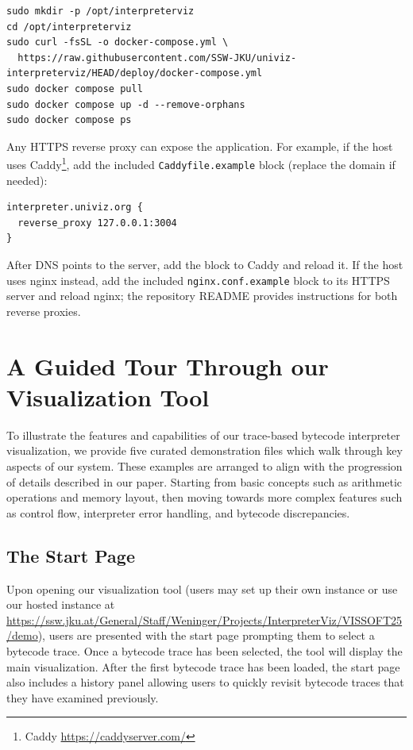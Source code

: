 \documentclass[conference]{IEEEtran}
\begin{document}
\begin{lstlisting}[language={},numbers=none,basicstyle=\ttfamily\scriptsize]
sudo mkdir -p /opt/interpreterviz
cd /opt/interpreterviz
sudo curl -fsSL -o docker-compose.yml \
  https://raw.githubusercontent.com/SSW-JKU/univiz-interpreterviz/HEAD/deploy/docker-compose.yml
sudo docker compose pull
sudo docker compose up -d --remove-orphans
sudo docker compose ps
\end{lstlisting}

Any HTTPS reverse proxy can expose the application. For example, if the host uses Caddy\footnote{Caddy \url{https://caddyserver.com/}}, add the included \texttt{Caddyfile.example} block (replace the domain if needed):

\begin{lstlisting}[language={},numbers=none,basicstyle=\ttfamily\scriptsize]
interpreter.univiz.org {
  reverse_proxy 127.0.0.1:3004
}
\end{lstlisting}

After DNS points to the server, add the block to Caddy and reload it. If the host uses nginx instead, add the included \texttt{nginx.conf.example} block to its HTTPS server and reload nginx; the repository README provides instructions for both reverse proxies.

\section{A Guided Tour Through our\\Visualization Tool}

To illustrate the features and capabilities of our trace-based bytecode interpreter visualization, we provide five curated demonstration files which walk through key aspects of our system. 
These examples are arranged to align with the progression of details described in our paper. Starting from basic concepts such as arithmetic operations and memory layout, then moving towards more complex features such as control flow, interpreter error handling, and bytecode discrepancies.

\subsection{The Start Page}

Upon opening our visualization tool (users may set up their own instance or use our hosted instance at \url{https://ssw.jku.at/General/Staff/Weninger/Projects/InterpreterViz/VISSOFT25/demo}), users are presented with the start page prompting them to select a bytecode trace. Once a bytecode trace has been selected, the tool will display the main visualization. After the first bytecode trace has been loaded, the start page also includes a history panel allowing users to quickly revisit bytecode traces that they have examined previously.
\end{document}
